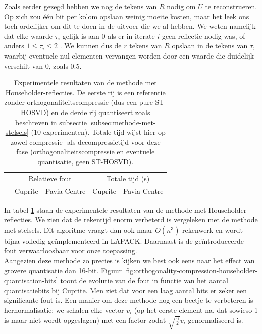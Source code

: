 Zoals eerder gezegd hebben we nog de tekens van $R$ nodig om $U$ te reconstrueren. Op zich zou \'e\'en bit per kolom opslaan weinig moeite kosten, maar het leek ons toch ordelijker om dit te doen in de uitvoer die we al hebben. We weten namelijk dat elke waarde $\tau_i$ gelijk is aan 0 als er in iterate $i$ geen reflectie nodig was, of anders $1 \leq \tau_i \leq 2$ \cite{ref:slarfg}. We kunnen dus de $r$ tekens van $R$ opslaan in de tekens van $\tau$, waarbij eventuele nul-elementen vervangen worden door een waarde die duidelijk verschilt van 0, zoals 0.5.

\begin{table}[H]
\centering
\footnotesize
\begin{tabular}{|l|c|c|c|c|}
\hline
\multirow{2}{*}{} & \multicolumn{2}{c|}{Relatieve fout} & \multicolumn{2}{c|}{Totale tijd (s)} \\ \cline{2-5} 
 & Cuprite & Pavia Centre & Cuprite & Pavia Centre \\ \hline
                             
\end{tabular}
\normalsize
\caption{Experimentele resultaten van de methode met Householder-reflecties. De eerste rij is een referentie zonder orthogonaliteitscompressie (dus een pure ST-HOSVD) en de derde rij quantiseert zoals beschreven in subsectie \ref{subsec:methode-met-stelsels} (10 experimenten). Totale tijd wijst hier op zowel compressie- als decompressietijd voor deze fase (orthogonaliteitscompressie en eventuele quantisatie, geen ST-HOSVD).}
\label{table:orthogonality-compression-householder-summary}
\end{table}

In tabel \ref{table:orthogonality-compression-householder-summary} staan de experimentele resultaten van de methode met Householder-reflecties. We zien dat de rekentijd enorm verbeterd is vergeleken met de methode met stelsels. Dit algoritme vraagt dan ook maar $O(n^3)$ rekenwerk en wordt bijna volledig ge\"implementeerd in LAPACK. Daarnaast is de ge\"introduceerde fout verwaarloosbaar voor onze toepassing.\\

Aangezien deze methode zo precies is kijken we best ook eens naar het effect van grovere quantisatie dan 16-bit. Figuur \ref{fig:orthogonality-compression-householder-quantisation-bits} toont de evolutie van de fout in functie van het aantal quantisatiebits bij Cuprite. Men ziet dat voor een laag aantal bits er zeker een significante fout is. Een manier om deze methode nog een beetje te verbeteren is hernormalisatie: we schalen elke vector $v_i$ (op het eerste element na, dat sowieso 1 is maar niet wordt opgeslagen) met een factor zodat $\sqrt{\frac{\tau_i}{2}} v_i$ genormaliseerd is.

